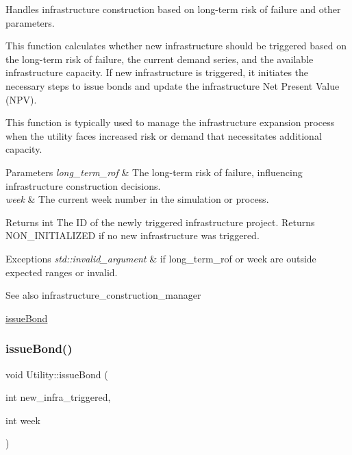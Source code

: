 Handles infrastructure construction based on long-\/term risk of failure and other parameters. 

This function calculates whether new infrastructure should be triggered based on the long-\/term risk of failure, the current demand series, and the available infrastructure capacity. If new infrastructure is triggered, it initiates the necessary steps to issue bonds and update the infrastructure Net Present Value (N\+PV).

This function is typically used to manage the infrastructure expansion process when the utility faces increased risk or demand that necessitates additional capacity.


\begin{DoxyParams}{Parameters}
{\em long\+\_\+term\+\_\+rof} & The long-\/term risk of failure, influencing infrastructure construction decisions.\\
\hline
{\em week} & The current week number in the simulation or process.\\
\hline
\end{DoxyParams}
\begin{DoxyReturn}{Returns}
int The ID of the newly triggered infrastructure project. Returns N\+O\+N\+\_\+\+I\+N\+I\+T\+I\+A\+L\+I\+Z\+ED if no new infrastructure was triggered.
\end{DoxyReturn}

\begin{DoxyExceptions}{Exceptions}
{\em std\+::invalid\+\_\+argument} & if long\+\_\+term\+\_\+rof or week are outside expected ranges or invalid.\\
\hline
\end{DoxyExceptions}
\begin{DoxySeeAlso}{See also}
infrastructure\+\_\+construction\+\_\+manager 

\mbox{\hyperlink{classUtility_a152ceea2917ea7715e8fbf8aff24390f}{issue\+Bond}} 
\end{DoxySeeAlso}
\mbox{\label{classUtility_a152ceea2917ea7715e8fbf8aff24390f}} 
\subsubsection{\texorpdfstring{issue\+Bond()}{issueBond()}}
{\footnotesize\ttfamily void Utility\+::issue\+Bond (\begin{DoxyParamCaption}\item[{int}]{new\+\_\+infra\+\_\+triggered,  }\item[{int}]{week }\end{DoxyParamCaption})}




